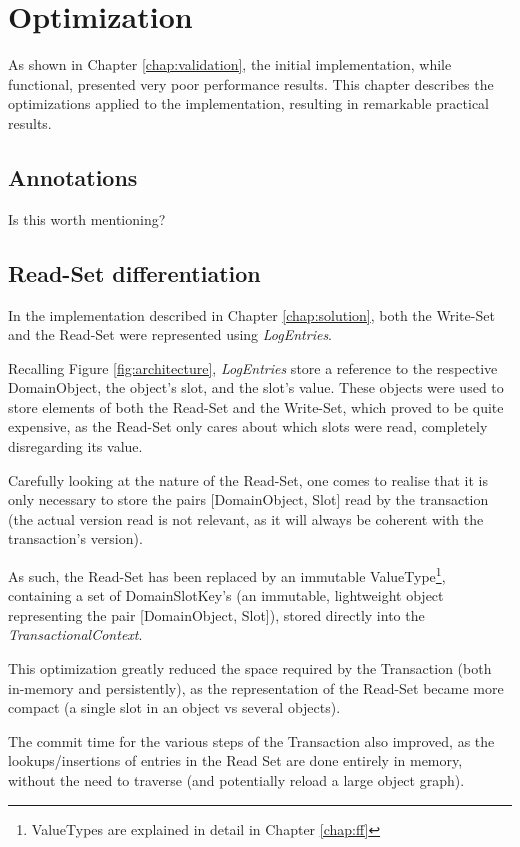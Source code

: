 \chapter{Optimization}

As shown in Chapter \ref{chap:validation}, the initial implementation,
while functional, presented very poor performance results. This
chapter describes the optimizations applied to the implementation,
resulting in remarkable practical results.

\section{Annotations}

Is this worth mentioning?

\section{Read-Set differentiation}

In the implementation described in Chapter \ref{chap:solution}, both
the Write-Set and the Read-Set were represented using {\it LogEntries}.

Recalling Figure \ref{fig:architecture}, {\it LogEntries} store a
reference to the respective DomainObject, the object's slot, and the
slot's value. These objects were used to store elements of both the
Read-Set and the Write-Set, which proved to be quite expensive, as the
Read-Set only cares about which slots were read, completely
disregarding its value.

Carefully looking at the nature of the Read-Set, one comes to realise
that it is only necessary to store the pairs [DomainObject, Slot] read
by the transaction (the actual version read is not relevant, as it
will always be coherent with the transaction's version).


As such, the Read-Set has been replaced by an immutable
ValueType\footnote{ValueTypes are explained in detail in Chapter
  \ref{chap:ff}}, containing a set of DomainSlotKey's (an immutable,
lightweight object representing the pair [DomainObject, Slot]), stored
directly into the {\it TransactionalContext}.

This optimization greatly reduced the space required by the
Transaction (both in-memory and persistently), as the representation
of the Read-Set became more compact (a single slot in an object vs
several objects).

The commit time for the various steps of the Transaction also
improved, as the lookups/insertions of entries in the Read Set are
done entirely in memory, without the need to traverse (and
potentially reload a large object graph).

